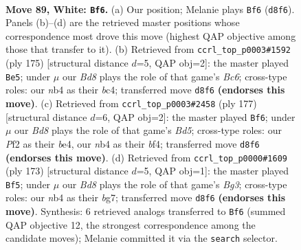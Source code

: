 \documentclass[11pt]{article}
\begin{document}
\clearpage

\begin{figure}[p]\centering
\begin{subfigure}{0.46\textwidth}\centering
\resizebox{\linewidth}{!}{%
\newchessgame
\chessboard[
  setfen={3B4/8/7k/8/1nb4K/8/5P2/8 w - - 23 89},
  showmover=false,
  pgfstyle=straightmove, color=movearrow, markmove={d8-f6}
]}
\caption{}
\end{subfigure}\hfill
\begin{subfigure}{0.46\textwidth}\centering
\resizebox{\linewidth}{!}{%
\newchessgame
\chessboard[
  setfen={7k/8/6K1/8/2B1p3/2b1B3/8/8 b - - 37 88},
  showmover=false,
  pgfstyle=straightmove, color=movearrow, markmove={c3-e5}
]}
\caption{}
\end{subfigure}
\\[4pt]
\begin{subfigure}{0.46\textwidth}\centering
\resizebox{\linewidth}{!}{%
\newchessgame
\chessboard[
  setfen={8/8/8/8/3bBB2/1K5p/8/k7 b - - 3 89},
  showmover=false,
  pgfstyle=straightmove, color=movearrow, markmove={d4-f6}
]}
\caption{}
\end{subfigure}\hfill
\begin{subfigure}{0.46\textwidth}\centering
\resizebox{\linewidth}{!}{%
\newchessgame
\chessboard[
  setfen={4k3/6B1/6b1/6P1/8/8/8/2K5 b - - 6 87},
  showmover=false,
  pgfstyle=straightmove, color=movearrow, markmove={g6-f5}
]}
\caption{}
\end{subfigure}
\caption{\textbf{Move 89, White: \texttt{Bf6}.} (a) Our position; Melanie plays \texttt{Bf6} (\texttt{d8f6}). Panels (b)--(d) are the retrieved master positions whose correspondence most drove this move (highest QAP objective among those that transfer to it). (b) Retrieved from \texttt{ccrl\_top\_p0003\#1592} (ply 175) [structural distance $d$=5, QAP obj=2]: the master played \texttt{Be5}; under $\mu$ our \emph{Bd8} plays the role of that game's \emph{Bc6}; cross-type roles: our \emph{n}b4 as their \emph{b}c4; transferred move \texttt{d8f6} \textbf{(endorses this move)}. (c) Retrieved from \texttt{ccrl\_top\_p0003\#2458} (ply 177) [structural distance $d$=6, QAP obj=2]: the master played \texttt{Bf6}; under $\mu$ our \emph{Bd8} plays the role of that game's \emph{Bd5}; cross-type roles: our \emph{P}f2 as their \emph{b}e4, our \emph{n}b4 as their \emph{b}f4; transferred move \texttt{d8f6} \textbf{(endorses this move)}. (d) Retrieved from \texttt{ccrl\_top\_p0000\#1609} (ply 173) [structural distance $d$=5, QAP obj=1]: the master played \texttt{Bf5}; under $\mu$ our \emph{Bd8} plays the role of that game's \emph{Bg3}; cross-type roles: our \emph{n}b4 as their \emph{b}g7; transferred move \texttt{d8f6} \textbf{(endorses this move)}. Synthesis: 6 retrieved analogs transferred to \texttt{Bf6} (summed QAP objective 12, the strongest correspondence among the candidate moves); Melanie committed it via the \texttt{search} selector.}
\label{fig:thought-m176}
\end{figure}
\end{document}
